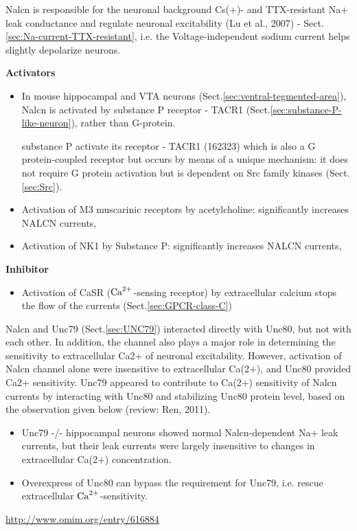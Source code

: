 Nalcn is responsible for the neuronal background Cs(+)- and TTX-resistant Na+
leak conductance and regulate neuronal excitability (Lu et al., 2007) -
Sect.\ref{sec:Na-current-TTX-resistant}, i.e. 
the Voltage-independent sodium current helps slightly depolarize
neurons. 

{\bf Activators}
\begin{itemize}
  
  \item  In mouse hippocampal and VTA neurons
  (Sect.\ref{sec:ventral-tegmented-area}), Nalcn is activated by substance P
  receptor - TACR1 (Sect.\ref{sec:substance-P-like-neuron}), rather than
  G-protein.
  
  substance P activate its receptor - TACR1 (162323) which is also a G
  protein-coupled receptor but occurs by means of a unique mechanism: it does
  not require G protein activation but is dependent on Src family kinases
  (Sect.\ref{sec:Src}).

  \item Activation of M3 muscarinic receptors by acetylcholine:  significantly
  increases NALCN currents,
  
  \item Activation of NK1 by Substance P:  significantly increases NALCN
  currents,
\end{itemize}

{\bf Inhibitor}
\begin{itemize}
  \item  Activation of CaSR (${\text{Ca}^{2+}}$-sensing receptor) by extracellular calcium
  stops the flow of the currents (Sect.\ref{sec:GPCR-class-C})
\end{itemize}


Nalcn and Unc79 (Sect.\ref{sec:UNC79}) interacted directly with Unc80, but not
with each other. In addition, the channel also plays a major role in determining
the sensitivity to extracellular Ca2+ of neuronal excitability. However,
activation of Nalcn channel alone were insensitive to extracellular Ca(2+), and
Unc80 provided Ca2+ sensitivity. Unc79 appeared to contribute to Ca(2+)
sensitivity of Nalcn currents by interacting with Unc80 and stabilizing Unc80
protein level, based on the observation given below (review: Ren, 2011).
\begin{itemize}
  
  \item  Unc79 -/- hippocampal neurons showed normal Nalcn-dependent Na+ leak
  currents, but their leak currents were largely insensitive to changes in
  extracellular Ca(2+) concentration.
  
  \item Overexpress of Unc80 can bypass the requirement for Unc79, i.e. rescue
  extracellular ${\text{Ca}^{2+}}$-sensitivity.
\end{itemize}
\url{http://www.omim.org/entry/616884}


